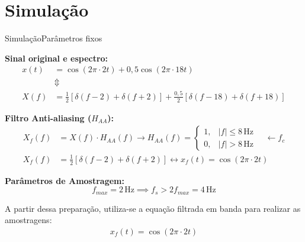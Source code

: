 
\section{Simulação}

\begin{frame}[allowframebreaks]{Simulação}{Parâmetros fixos}
    \small

    \textbf{Sinal original e espectro:}
    \begin{align*}
        x(t) &= \cos(2\pi \cdot 2t) + 0,5\cos(2\pi \cdot 18t) \\
        &\Updownarrow \\
        X(f) &= \frac{1}{2}[\delta(f-2) + \delta(f+2)]
        + \frac{0,5}{2}[\delta(f-18) + \delta(f+18)]
    \end{align*}

    \textbf{Filtro Anti-aliasing ($H_{AA}$):}
    \begin{align*}
        X_f(f) &= X(f) \cdot H_{AA}(f)
        \longrightarrow
        H_{AA}(f) =
        \begin{cases}
            1, & |f| \le 8\,\text{Hz}\\
            0, & |f| > 8\,\text{Hz}
        \end{cases}
        \quad \leftarrow f_c \\[2pt]
        X_f(f) &= \frac{1}{2}[\delta(f-2) + \delta(f+2)]
        \longleftrightarrow
        x_f(t) = \cos(2\pi \cdot 2t)
    \end{align*}

    \textbf{Parâmetros de Amostragem:}
    \[
        f_{max} = 2\,\text{Hz}
        \implies
        f_s > 2f_{max} = 4\,\text{Hz}
    \]

    A partir dessa preparação, utiliza-se a equação filtrada em banda para realizar as amostragens: \begin{align*} x_f(t) = \cos(2\pi \cdot 2t) \end{align*}

\end{frame}


